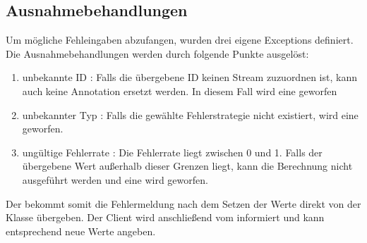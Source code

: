 \subsection{Ausnahmebehandlungen}

Um mögliche Fehleingaben abzufangen, wurden drei eigene Exceptions definiert. Die Ausnahmebehandlungen werden durch folgende Punkte ausgelöst:
	\begin{enumerate}
		\item unbekannte ID : Falls die übergebene ID keinen Stream zuzuordnen ist, kann auch keine Annotation ersetzt werden. In diesem Fall wird eine  geworfen
		\item unbekannter Typ : Falls die gewählte Fehlerstrategie nicht existiert, wird eine  geworfen.
		\item ungültige Fehlerrate : Die Fehlerrate liegt zwischen 0 und 1. Falls der übergebene Wert au\ss erhalb dieser Grenzen liegt, kann die Berechnung nicht ausgeführt werden und eine  wird geworfen.
	\end{enumerate}
Der  bekommt somit die Fehlermeldung nach dem Setzen der Werte direkt von der Klasse  übergeben. Der Client wird anschlie\ss end vom  informiert und kann entsprechend neue Werte angeben.


